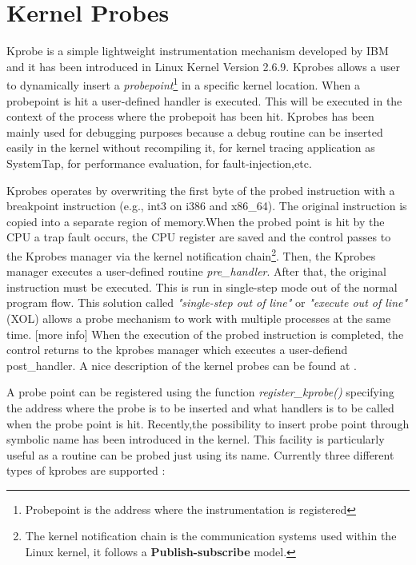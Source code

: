 \section{Kernel Probes}
\label{kernel_probes}
Kprobe \citep{Kprobes:2006} is a simple lightweight instrumentation mechanism developed by IBM and it has been introduced in Linux Kernel Version 2.6.9. Kprobes allows a user to dynamically insert a \textit{probepoint}\footnote{Probepoint is the address where the instrumentation is registered } in a specific kernel location. When a probepoint is hit a user-defined handler is executed. This will be executed in the context of the process where the probepoit has been hit. Kprobes has been mainly used for debugging purposes because a debug routine can be inserted easily in the kernel without recompiling it, for kernel tracing application as SystemTap\citep{SystemTap:Online}, for performance evaluation, for fault-injection,etc.  
\par
Kprobes operates by overwriting the first byte of the probed instruction with a breakpoint instruction (e.g., int3 on i386 and x86\_64). The original instruction is copied into a separate region of memory.When the probed point is hit by the CPU a trap fault occurs, the CPU register are saved and the control passes to the Kprobes manager via the kernel notification chain\footnote{The kernel notification chain is the communication systems used within the Linux kernel, it follows a \textbf{Publish-subscribe} model.}.
Then, the Kprobes manager executes a user-defined routine \textit{pre\_handler}. After that, the original instruction must be executed. This is run in single-step mode out of the normal program flow. This solution called \textit{"single-step out of line"} or  \textit{"execute out of line"} (XOL) allows a probe mechanism to work with multiple processes at the same time. [more info] 
When the execution of the probed instruction is completed, the control returns to the kprobes manager which executes  a user-defiend post\_handler. A nice description of the kernel probes can be found at \citep{Sudhanshu:2006:Online}.  
\par
A probe point can be registered using the function \textit{register\_kprobe()} specifying the address where the probe is to be inserted and what  handlers is to be called when the probe point is hit. Recently,the possibility to insert probe point through symbolic name has been introduced in the kernel. This facility is particularly useful as a routine can be probed just using its name.
Currently three different types of kprobes are supported : 

